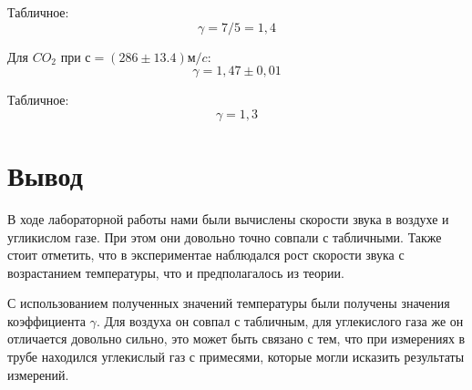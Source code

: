 \documentclass[11pt]{article}
\begin{document}
Табличное:
\[\gamma = 7/5 = 1,4\]

Для $CO_2$ при $с = (286 ± 13.4) м/c$:
\[\gamma = 1,47 \pm 0,01\]

Табличное:
\[\gamma = 1,3\]

\section{Вывод} 

В ходе лабораторной работы нами были вычислены скорости звука в воздухе и угликислом газе. При этом они довольно точно совпали с табличными.
Также стоит отметить, что в экспериментае наблюдался рост скорости звука с возрастанием температуры, что и предполагалось из теории.

С использованием полученных значений температуры
были получены значения коэффициента $\gamma$. Для воздуха он совпал с табличным, для углекислого газа же он отличается довольно сильно, это может быть связано с тем, что при измерениях в трубе находился углекислый газ с примесями, которые могли исказить результаты измерений.
\end{document}
